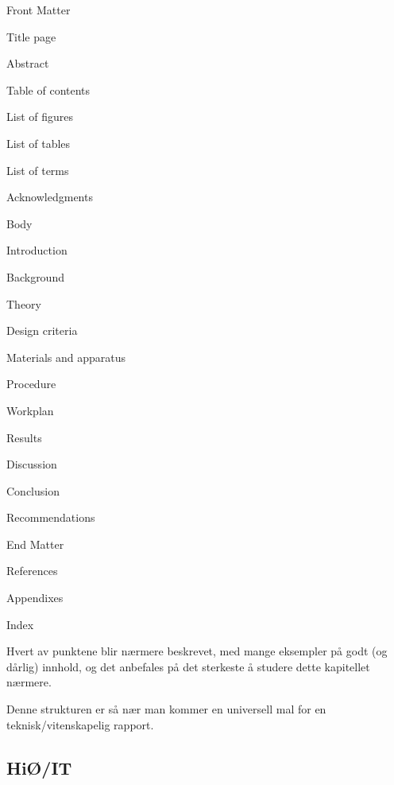 \begin{compactitem}
\item Front Matter
\begin{compactitem}
\item Title page
\item Abstract
\item Table of contents
\item List of figures
\item List of tables
\item List of terms
\item Acknowledgments
\end{compactitem}

\item Body
\begin{compactitem}
\item Introduction
\item Background
\item Theory
\item Design criteria
\item Materials and apparatus
\item Procedure
\item Workplan
\item Results
\item Discussion
\item Conclusion
\item Recommendations
\end{compactitem}

\item End Matter
\begin{compactitem}
\item References
\item Appendixes
\item Index
\end{compactitem}

\end{compactitem}

Hvert av punktene blir nærmere beskrevet, med mange eksempler på godt (og dårlig) innhold, og det anbefales på det sterkeste å  studere dette kapitellet nærmere. 

Denne strukturen er så nær man kommer en universell mal for en teknisk/vitenskapelig rapport.

\subsection{HiØ/IT}
\label{sec:hiof-it}

